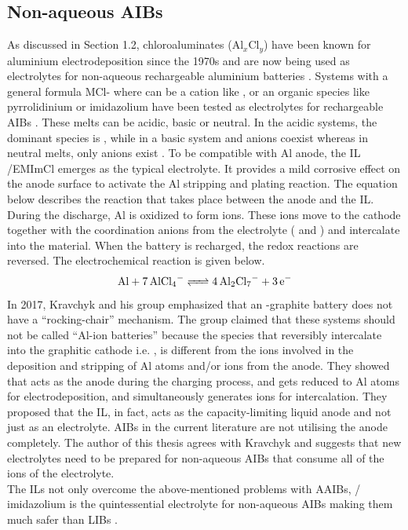 \subsection{Non-aqueous AIBs}
As discussed in Section 1.2, chloroaluminates (Al$_x$Cl$_y$) have been known for aluminium electrodeposition since the 1970s and are now being used as electrolytes for non-aqueous rechargeable aluminium batteries \cite{weppner_ionic_1976, fung_reaction_1972}. Systems with a general formula MCl- where  can be a cation like ,  or an organic species like pyrrolidinium or imidazolium have been tested as electrolytes for rechargeable AIBs \cite{das_aluminium-ion_2017}. These melts can be acidic, basic or neutral. In the acidic systems, the dominant species is , while in a basic system  and  anions coexist whereas in neutral melts, only  anions exist \cite{galinski_ionic_2006, holbrey_ionic_1999}. To be compatible with Al anode, the IL /EMImCl emerges as the typical electrolyte. It provides a mild corrosive effect on the anode surface to activate the Al stripping and plating reaction. The equation below describes the reaction that takes place between the anode and the IL. During the discharge, Al is oxidized to form  ions. These ions move to the cathode together with the coordination anions from the electrolyte ( and ) and intercalate into the material. When the battery is recharged, the redox reactions are reversed. The electrochemical reaction is given below.
\begin{equation}
        \ce{Al + 7AlCl4^{-} <=> 4Al2Cl7^{-} + 3e-}
\end{equation}
In 2017, Kravchyk and his group emphasized that an -graphite battery does not have a \enquote{rocking-chair} mechanism. The group claimed that these systems should not be called \enquote{Al-ion batteries} because the species that reversibly intercalate into the graphitic cathode i.e. , is different from the ions involved in the deposition and stripping of Al atoms and/or  ions from the anode. They showed that  acts as the anode during the charging process, and gets reduced to Al atoms for electrodeposition, and simultaneously generates  ions for intercalation. They proposed that the IL, in fact, acts as the capacity-limiting liquid anode and not just as an electrolyte. AIBs in the current literature are not utilising the anode completely. The author of this thesis agrees with Kravchyk and suggests that new electrolytes need to be prepared for non-aqueous AIBs that consume all of the  ions of the electrolyte. \\
The ILs not only overcome the above-mentioned problems with AAIBs, / imidazolium is the quintessential electrolyte for non-aqueous AIBs making them much safer than LIBs \cite{jayaprakash_rechargeable_2011, lin_ultrafast_2015, wang_new_2013-1, rani_fluorinated_2013}. 


